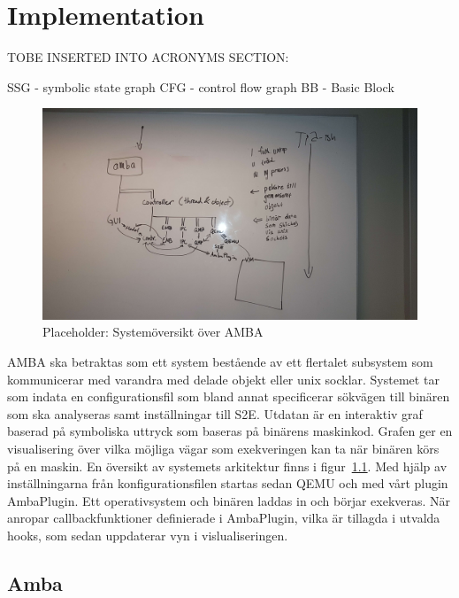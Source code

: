 \chapter{Implementation}

TOBE INSERTED INTO ACRONYMS SECTION:

SSG - symbolic state graph
CFG - control flow graph
BB - Basic Block


\begin{figure}
    \centering
    \includegraphics[width=\textwidth]{figures/arkitektur.jpg}
    \caption{Placeholder: Systemöversikt över AMBA}
    \label{fig:arkitektur}
\end{figure}

% 

AMBA ska betraktas som ett system bestående av ett flertalet subsystem som kommunicerar med varandra med delade objekt eller unix socklar.
Systemet tar som indata en configurationsfil som bland annat specificerar sökvägen till binären som ska analyseras samt inställningar till S2E.
Utdatan är en interaktiv graf baserad på symboliska uttryck som baseras på binärens maskinkod.
Grafen ger en visualisering över vilka möjliga vägar som exekveringen kan ta när binären körs på en maskin.
En översikt av systemets arkitektur finns i figur~\ref{fig:arkitektur}.
Med hjälp av inställningarna från konfigurationsfilen startas sedan QEMU och \stoe med vårt \stoe plugin AmbaPlugin.
Ett operativsystem och binären laddas in och börjar exekveras.
När \stoe anropar callbackfunktioner definierade i AmbaPlugin, vilka är tillagda i utvalda \stoe hooks, som sedan uppdaterar vyn i vislualiseringen.

\section{Amba}

